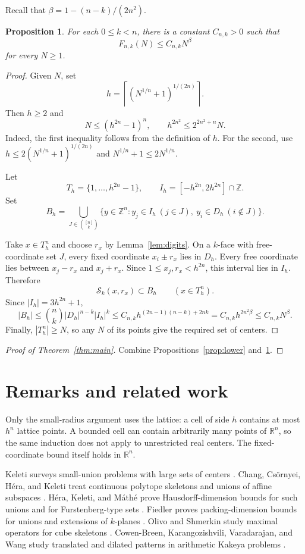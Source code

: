 \documentclass[11pt]{amsart}
\numberwithin{equation}{section}
\theoremstyle{plain}
\newtheorem{proposition}[theorem]{Proposition}
\theoremstyle{definition}
\newcommand{\R}{\mathbb{R}}
\newcommand{\Z}{\mathbb{Z}}
\newcommand{\cS}{\mathcal{S}}
\begin{document}
Recall that $\beta=1-(n-k)/(2n^2)$.

\begin{proposition}\label{prop:upper}
For each $0\leq k<n$, there is a constant $C_{n,k}>0$ such that
\[
 F_{n,k}(N)\leq C_{n,k}N^\beta
\]
for every $N\geq1$.
\end{proposition}

\begin{proof}
Given $N$, set
\[
 h=\left\lceil (N^{1/n}+1)^{1/(2n)}\right\rceil.
\]
Then $h\geq2$ and
\[
 N\leq(h^{2n}-1)^n,
 \qquad
 h^{2n^2}\leq2^{2n^2+n}N.
\]
Indeed, the first inequality follows from the definition of $h$.  For the
second, use $h\leq2(N^{1/n}+1)^{1/(2n)}$ and
$N^{1/n}+1\leq2N^{1/n}$.

Let
\[
 T_h=\{1,\ldots,h^{2n}-1\},
 \qquad
 I_h=[-h^{2n},2h^{2n}]\cap\Z.
\]
Set
\[
 B_h=
 \bigcup_{J\in\binom{[n]}{k}}
 \{y\in\Z^n:y_j\in I_h\ (j\in J),\ y_i\in D_h\ (i\notin J)\}.
\]

Take $x\in T_h^n$ and choose $r_x$ by Lemma~\ref{lem:digits}.  On a $k$-face
with free-coordinate set $J$, every fixed coordinate $x_i\pm r_x$ lies in
$D_h$.  Every free coordinate lies between $x_j-r_x$ and $x_j+r_x$.  Since
$1\leq x_j,r_x<h^{2n}$, this interval lies in $I_h$.  Therefore
\[
 \cS_k(x,r_x)\subset B_h\qquad(x\in T_h^n).
\]
Since $|I_h|=3h^{2n}+1$,
\[
 |B_h|
 \leq\binom{n}{k}|D_h|^{n-k}|I_h|^k
 \leq C_{n,k}h^{(2n-1)(n-k)+2nk}
 =C_{n,k}h^{2n^2\beta}
 \leq C_{n,k}N^\beta.
\]
Finally, $|T_h^n|\geq N$, so any $N$ of its points give the required set of
centers.
\end{proof}

\begin{proof}[Proof of Theorem~\ref{thm:main}]
Combine Propositions~\ref{prop:lower} and~\ref{prop:upper}.
\end{proof}

\section{Remarks and related work}

Only the small-radius argument uses the lattice: a cell of side $h$ contains
at most $h^n$ lattice points.  A bounded cell can contain arbitrarily many
points of $\R^n$, so the same induction does not apply to unrestricted real
centers.  The fixed-coordinate bound itself holds in $\R^n$.

Keleti surveys small-union problems with large sets of centers
\cite{Keleti2017}.  Chang, Cs\"ornyei, H\'era, and Keleti treat continuous
polytope skeletons and unions of affine subspaces
\cite{ChangCsornyeiHeraKeleti2018}.  H\'era, Keleti, and M\'ath\'e prove
Hausdorff-dimension bounds for such unions and for Furstenberg-type sets
\cite{HeraKeletiMathe2019}.  Fiedler proves packing-dimension bounds for
unions and extensions of $k$-planes \cite{Fiedler2026}.  Olivo and Shmerkin
study maximal operators for cube skeletons \cite{OlivoShmerkin2020}.
Cowen-Breen, Karangozishvili, Varadarajan, and Wang study translated and
dilated patterns in arithmetic Kakeya problems \cite{CowenBreenEtAl2020}.



\end{document}
